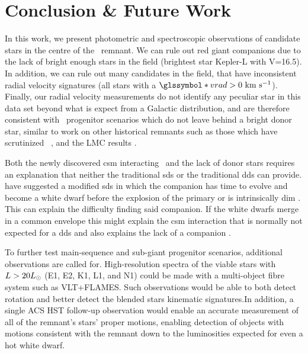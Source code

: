 \documentclass[preprint2]{aastex}
\begin{document}



\section{Conclusion \& Future Work}

\label{sec:conclusion}

In this work, we present photometric and spectroscopic observations of candidate stars in the centre of the \ remnant. We can rule out red giant companions due to the lack of bright enough stars in the field (brightest star Kepler-L with V=16.5). In addition, we can rule out many candidates in the field, that have inconsistent radial velocity signatures (all stars with a $\vrad>0~\kms$). Finally, our radial velocity measurements do not identify any peculiar star in this data set beyond what is expect from a Galactic distribution, and are therefore consistent with \snia\ progenitor scenarios which do not leave behind a bright donor star, similar to work on other historical remnants such as those which have scrutinized \ \citep{2012Natur.489..533G,2012ApJ...759....7K}, and the LMC results \citep{2012ApJ...747L..19E, 2012Natur.481..164S}. 

Both the newly discovered \gls{csm} interacting \sneia\ and the lack of donor stars requires an explanation that neither the traditional \gls{sds} or the traditional \gls{dds} can provide. \citet{2011ApJ...730L..34J,2011ApJ...738L...1D,2012ApJ...744...69H,2012ApJ...756L...4H} have suggested a modified \gls{sds} in which the companion has time to evolve and become a white dwarf before the explosion of the primary or is intrinsically dim \citep{2012ApJ...758..123W}. This can explain the difficulty finding said companion. If the white dwarfs merge in a common envelope this might explain the \gls{csm} interaction that is normally not expected for a \gls{dds} and also explains the lack of a companion \citep[][, van Kerkwijk priv. comm. ]{2011MNRAS.417.1466K}.  

To further test main-sequence and sub-giant progenitor scenarios, additional observations are called for. High-resolution spectra of the viable stars with $L>20\hbox{$L_{\odot}$}$ (E1, E2, K1, L1, and N1) could be made with a multi-object fibre system such as VLT+FLAMES. Such observations would be able to both detect rotation and better detect the blended stars kinematic signatures.In addition, a single ACS HST follow-up observation would enable an accurate measurement of all of the remnant's stars' proper motions, enabling detection of objects with motions consistent with the remnant down to the luminosities expected for even a hot white dwarf. 
\end{document}
